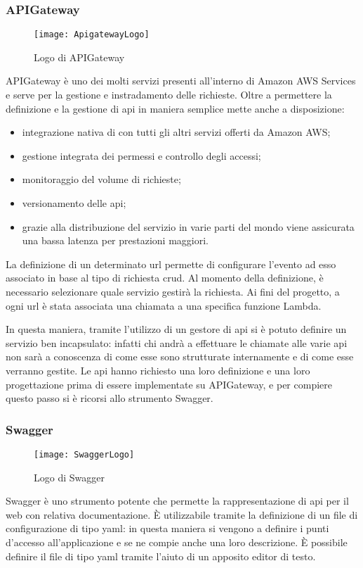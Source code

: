 \subsubsection{APIGateway}
\begin{figure}[H]
  \centering
  \texttt{[image: ApigatewayLogo]}
  \caption{Logo di APIGateway}
\end{figure}
APIGateway è uno dei molti servizi presenti all'interno di Amazon AWS Services
e serve per la gestione e instradamento delle richieste.
Oltre a permettere la definizione e la gestione di \gls{api} in maniera
semplice mette anche a disposizione:
\begin{itemize}
  \item integrazione nativa di con tutti gli altri servizi offerti da Amazon
AWS;
  \item gestione integrata dei permessi e controllo degli accessi;
  \item monitoraggio del volume di richieste;
  \item versionamento delle \gls{api};
  \item grazie alla distribuzione del servizio in varie parti del mondo viene
assicurata una bassa latenza per prestazioni maggiori.
\end{itemize}
La definizione di un determinato \gls{url} permette di configurare l'evento ad
esso associato in base al tipo di richiesta \gls{crud}. Al momento della
definizione, è necessario selezionare quale servizio gestirà la richiesta. Ai
fini del progetto, a ogni \gls{url} è stata associata una chiamata a una
specifica funzione Lambda.

In questa maniera, tramite l'utilizzo di un gestore di \gls{api} si è potuto
definire un servizio  ben incapsulato: infatti
chi andrà a effettuare le chiamate alle varie \gls{api} non sarà a conoscenza di
come esse sono strutturate internamente e di come esse verranno gestite.
Le \gls{api} hanno richiesto una loro definizione e una loro progettazione
prima di essere implementate su APIGateway, e per compiere questo passo si è
ricorsi allo strumento Swagger.


\subsubsection{Swagger}
\begin{figure}[H]
  \centering
  \texttt{[image: SwaggerLogo]}
  \caption{Logo di Swagger}
\end{figure}
Swagger è uno strumento potente che permette la rappresentazione di \gls{api}
per il web con relativa documentazione. È utilizzabile tramite la definizione
di un file di configurazione di tipo \gls{yaml}: in questa maniera si vengono a
definire i punti d'accesso all'applicazione e se ne compie anche una loro
descrizione. È possibile definire il file di tipo \gls{yaml} tramite l'aiuto di
un apposito editor di testo.

